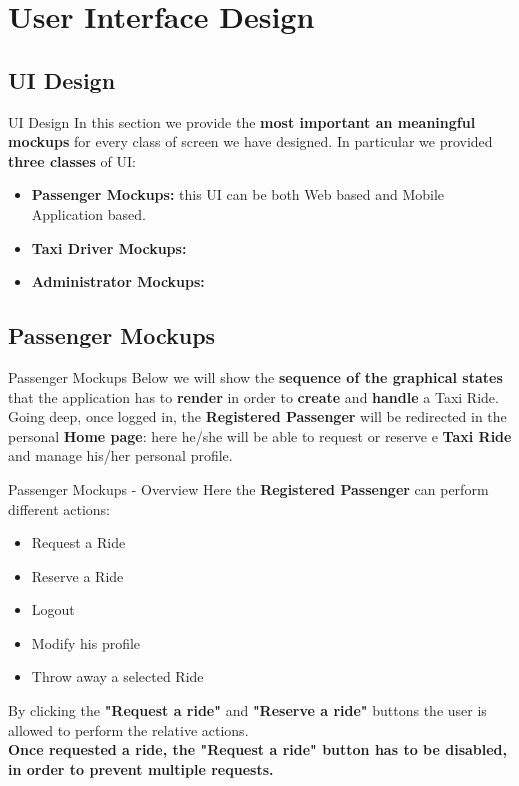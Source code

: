 \documentclass{../common/latex_classes/pdf_presentation}
\newcommand{\itemBold}[1]{\item\textbf{#1:}}
\begin{document}
	\section{User Interface Design}
	
	\subsection{UI Design}
	
	\begin{frame}{UI Design}
		In this section we provide the \textbf{most important an meaningful mockups} for every class of screen we have designed.
		In particular we provided \textbf{three classes} of UI:
		\begin{itemize}
			\itemBold {Passenger Mockups} this UI can be both Web based and Mobile Application based.
			\itemBold {Taxi Driver Mockups}
			\itemBold {Administrator Mockups}
		\end{itemize}
	\end{frame}

	\subsection{Passenger Mockups}
	\begin{frame}{Passenger Mockups}
		Below we will show the \textbf{sequence of the graphical states} that the application has to \textbf{render} in order to \textbf{create} and \textbf{handle} a Taxi Ride.
		Going deep, once logged in, the \textbf{Registered Passenger} will be redirected in the personal \textbf{Home page}: here he/she will be able to request or reserve e \textbf{Taxi Ride} and manage his/her personal profile.
	\end{frame}
	
	\begin{frame} {Passenger Mockups - Overview}
		Here the \textbf{Registered Passenger} can perform different actions:
		\begin{itemize}
			\item Request a Ride
			\item Reserve a Ride
			\item Logout
			\item Modify his profile
			\item Throw away a selected Ride
		\end{itemize}
		By clicking the \textbf{"Request a ride"} and \textbf{"Reserve a ride"} buttons the user is allowed to perform the relative actions.\\
		\textbf{Once requested a ride, the "Request a ride" button has to be disabled, in order to prevent multiple requests.}
	\end{frame}
	
\end{document}
